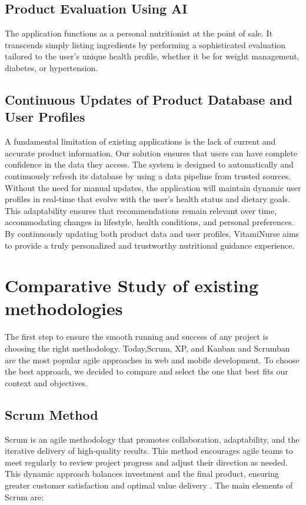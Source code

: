 \subsection{Product Evaluation Using AI}

The application functions as a personal nutritionist at the point of sale.
It transcends simply listing ingredients by performing a sophisticated
evaluation tailored to the user’s unique health profile, whether it be for
weight management, diabetes, or hypertension.


\subsection{Continuous Updates of Product Database and User Profiles}

A fundamental limitation of existing applications is the lack of current
and accurate product information. Our solution ensures that users can
have complete confidence in the data they access. The system is designed
to automatically and continuously refresh its database by using a data
pipeline from trusted sources.
Without the need for manual updates, the application will maintain
dynamic user profiles in real-time that evolve with the user’s health
status and dietary goals. This adaptability ensures that recommendations
remain relevant over time, accommodating changes in lifestyle, health
conditions, and personal preferences. By continuously updating both
product data and user profiles, VitamiNurse aims to provide a truly
personalized and trustworthy nutritional guidance experience.


\section{Comparative Study of existing methodologies}

The first step to ensure the smooth running and success of any project
is choosing the right methodology. Today,Scrum, XP, and Kanban and
Scrumban are the most popular agile approaches in web and mobile
development. To choose the best approach, we decided to compare and
select the one that best fits our context and objectives.

\subsection{Scrum Method} 


\par Scrum is an agile methodology that promotes collaboration, adaptability, and the iterative delivery of high-quality results. This method encourages agile teams to meet regularly to review project progress and adjust their direction as needed. This dynamic approach balances investment and the final product, ensuring greater customer satisfaction and optimal value delivery \cite{scrum2025}.
The main elements of Scrum are:

